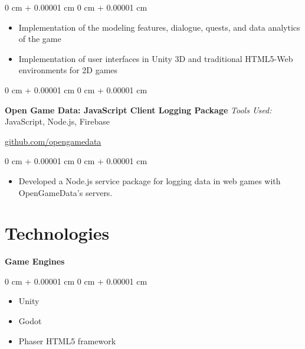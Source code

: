 \documentclass[10pt, letterpaper]{article}
\newenvironment{highlights}{
    \begin{itemize}[
        topsep=0.10 cm,
        parsep=0.10 cm,
        partopsep=0pt,
        itemsep=0pt,
        leftmargin=0 cm + 10pt
    ]
}{
    \end{itemize}
} %
\newenvironment{onecolentry}{
    \begin{adjustwidth}{
        0 cm + 0.00001 cm
    }{
        0 cm + 0.00001 cm
    }
}{
    \end{adjustwidth}
} %
\newenvironment{twocolentry}[2][]{
    \onecolentry
    \def\secondColumn{#2}
    \setcolumnwidth{\fill, 4.5 cm}
    \begin{paracol}{2}
}{
    \switchcolumn \raggedleft \secondColumn
    \end{paracol}
    \endonecolentry
} %
\begin{document}
        \vspace{0.10 cm}
        \begin{onecolentry}
            \begin{highlights}
                \item Implementation of the modeling features, dialogue, quests, and data analytics of the game
                \item Implementation of user interfaces in Unity 3D and traditional HTML5-Web environments for 2D games
            \end{highlights}
        \end{onecolentry}

        \vspace{0.2 cm}

        \begin{twocolentry}{
            \href{https://github.com/opengamedata/opengamedata-js-log}{github.com/opengamedata}
        }
            \textbf{Open Game Data: JavaScript Client Logging Package} \newline
            \hspace{0.2 cm} \textit{Tools Used:} JavaScript, Node.js, Firebase
        \end{twocolentry}

        \vspace{0.10 cm}
        \begin{onecolentry}
            \begin{highlights}
                \item Developed a Node.js service package for logging data in web games with OpenGameData's servers.
            \end{highlights}
        \end{onecolentry}

        \vspace{0.2 cm}

    
    \section{Technologies}

        \textbf{Game Engines}
        
        \begin{onecolentry}
            \begin{itemize}
                \item Unity
                \item Godot
                \item Phaser HTML5 framework
            \end{itemize}
        \end{onecolentry}
        
\end{document}
